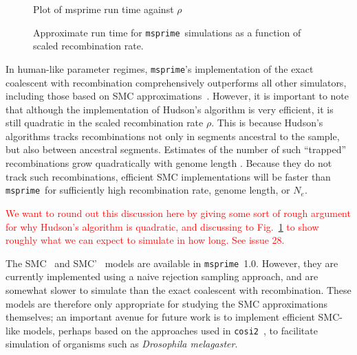 \documentclass{article}
\newcommand{\msprime}[0]{\texttt{msprime}}
\newcommand{\jkcomment}[1]{\textcolor{red}{#1}}
\begin{document}
\begin{figure}
\Large{Plot of msprime run time against $\rho$}
\caption{\label{fig-recombination-perf} Approximate run time for \msprime\
simulations as a function of scaled recombination rate.
}
\end{figure}

In human-like parameter regimes, \msprime's implementation of the
exact coalescent with recombination comprehensively outperforms
all other simulators, including those based on SMC
approximations~\citep{kelleher2016efficient}. However, it is important
to note that although the implementation of Hudson's algorithm is
very efficient, it is still quadratic in the scaled recombination rate
$\rho$. This is because Hudson's algorithms tracks recombinations not only
in segments ancestral to the sample, but also between ancestral segments.
Estimates of the number of such ``trapped'' recombinations grow quadratically
with genome length \citep[Eq.~5.10]{hein2004gene}.
Because they do not track such recombinations, efficient SMC implementations
will be faster than \msprime\ for sufficiently high recombination rate,
genome length, or $N_e$. %


\jkcomment{We want to round out this discussion here by giving some
sort of rough argument for why Hudson's algorithm is quadratic, and discussing
to Fig.~\ref{fig-recombination-perf} to show roughly what we can expect
to simulate in how long. See issue 28.}

The SMC~\citep{mcvean2005approximating} and
SMC'~\citep{marjoram2006fast} models are available
in \msprime\ 1.0. However, they are currently implemented using a
naive rejection sampling approach, and are somewhat slower
to simulate than the exact coalescent with recombination. These
models are therefore only appropriate for studying the SMC approximations
themselves; an important avenue for future work is to implement
efficient SMC-like models, perhaps based on the approaches used
in \texttt{cosi2}~\citep{shlyakhter2014cosi2}, to facilitate
simulation of organisms such as \textit{Drosophila melagaster}.
\end{document}
